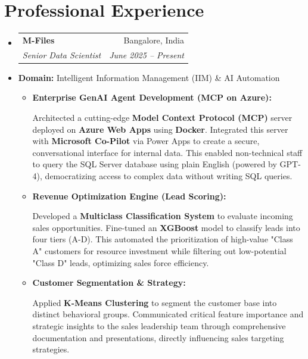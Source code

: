 \documentclass[10pt,a4paper]{article}
\makeatletter
\newcommand{\resumeItem}[1]{
  \item\small{
    {#1 \vspace{-2pt}}
  }
}
\newcommand{\resumeSubheading}[4]{
  \vspace{-1pt}\item
    \begin{tabular*}{0.97\textwidth}[t]{l@{\extracolsep{\fill}}r}
      \textbf{#1} & #2 \\
      \textit{\small#3} & \textit{\small #4} \\
    \end{tabular*}\vspace{-5pt}
}
\makeatother
\begin{document}
\section{Professional Experience}
\begin{itemize}[leftmargin=0.15in, label={}]

  \resumeSubheading
      {M-Files}{Bangalore, India}
      {Senior Data Scientist}{June 2025 -- Present}
      \resumeItem{\textbf{Domain:} Intelligent Information Management (IIM) \& AI Automation}
      \begin{itemize}
        \resumeItem{\textbf{Enterprise GenAI Agent Development (MCP on Azure):}}
          {Architected a cutting-edge \textbf{Model Context Protocol (MCP)} server deployed on \textbf{Azure Web Apps} using \textbf{Docker}. Integrated this server with \textbf{Microsoft Co-Pilot} via Power Apps to create a secure, conversational interface for internal data. This enabled non-technical staff to query the SQL Server database using plain English (powered by GPT-4), democratizing access to complex data without writing SQL queries.}
        \resumeItem{\textbf{Revenue Optimization Engine (Lead Scoring):}}
          {Developed a \textbf{Multiclass Classification System} to evaluate incoming sales opportunities. Fine-tuned an \textbf{XGBoost} model to classify leads into four tiers (A-D). This automated the prioritization of high-value "Class A" customers for resource investment while filtering out low-potential "Class D" leads, optimizing sales force efficiency.}
        \resumeItem{\textbf{Customer Segmentation \& Strategy:}}
          {Applied \textbf{K-Means Clustering} to segment the customer base into distinct behavioral groups. Communicated critical feature importance and strategic insights to the sales leadership team through comprehensive documentation and presentations, directly influencing sales targeting strategies.}
      \end{itemize}


\end{itemize}
\end{document}
